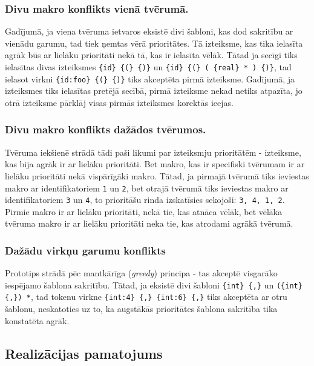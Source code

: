 \subsubsection{Divu makro konflikts vienā tvērumā.}

Gadījumā, ja viena tvēruma ietvaros eksistē divi šabloni, kas dod sakritību ar vienādu garumu, tad tiek ņemtas vērā prioritātes. Tā izteiksme, kas tika ielasīta agrāk būs ar lielāku prioritāti nekā tā, kas ir ielasīta vēlāk. Tātad ja secīgi tiks ielasītas divas izteiksmes \verb|{id} {(} {)}| un \verb|{id} {(} ( {real} * ) {)}|, tad ielasot virkni \verb|{id:foo} {(} {)}| tiks akceptēta pirmā izteiksme. Gadījumā, ja izteiksmes tiks ielasītas pretējā secībā, pirmā izteiksme nekad netiks atpazīta, jo otrā izteiksme pārklāj visas pirmās izteiksmes korektās ieejas.

\subsubsection{Divu makro konflikts dažādos tvērumos.}

Tvēruma iekšienē strādā tādi paši likumi par izteiksmju prioritātēm - izteiksme, kas bija agrāk ir ar lielāku prioritāti. Bet makro, kas ir specifiski tvērumam ir ar lielāku prioritāti nekā vispārīgāki makro. Tātad, ja pirmajā tvērumā tiks ieviestas makro ar identifikatoriem \verb|1| un \verb|2|, bet otrajā tvērumā tiks ieviestas makro ar identifikatoriem \verb|3| un \verb|4|, to prioritāšu rinda izskatīsies sekojoši: \verb|3, 4, 1, 2|. Pirmie makro ir ar lielāku prioritāti, nekā tie, kas atnāca vēlāk, bet vēlāka tvēruma makro ir ar lielāku prioritāti neka tie, kas atrodami agrākā tvērumā.

\subsubsection{Dažādu virkņu garumu konflikts}
Prototips strādā pēc mantkārīga (\emph{greedy}) principa - tas akceptē visgarāko iespējamo šablona sakritību. Tātad, ja eksistē divi šabloni \verb|{int} {,}| un \verb|({int} {,}) *|, tad tokenu virkne \verb|{int:4} {,} {int:6} {,}| tiks akceptēta ar otru šablonu, neskatoties uz to, ka augstākās prioritātes šablona sakritība tika konstatēta agrāk.

\subsection{\label{sbs:sol_motivation}Realizācijas pamatojums}

